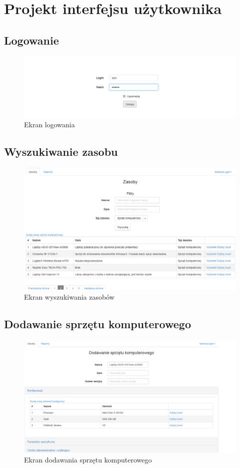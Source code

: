 \section{Projekt interfejsu użytkownika}
\subsection{Logowanie}
\begin{figure}[H]
	\centering
	\includegraphics[scale=0.4]{img/screens/logowanie.png}
	\caption{Ekran logowania}
\end{figure}

\subsection{Wyszukiwanie zasobu}
\begin{figure}[H]
	\centering
	\includegraphics[scale=0.4]{img/screens/wyszZasob.png}
	\caption{Ekran wyszukiwania zasobów}
\end{figure}

\subsection{Dodawanie sprzętu komputerowego}
\begin{figure}[H]
	\centering
	\includegraphics[scale=0.4]{img/screens/dodawanieSprzetuKomputerowego.png}
	\caption{Ekran dodawania sprzętu komputerowego}
\end{figure}

